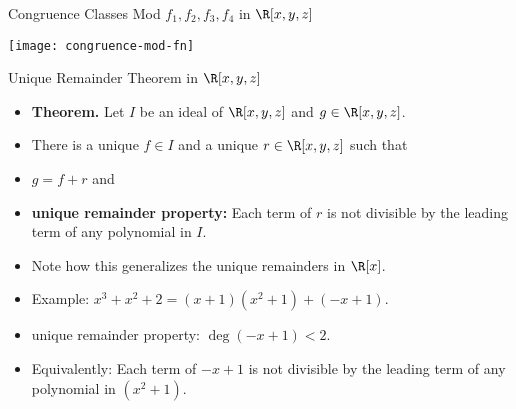 \documentclass{beamer}
\begin{document}
\begin{frame}{Congruence Classes Mod $f_1,f_2,f_3,f_4$ in $\R[x,y,z]$}

\begin{center}
\texttt{[image: congruence-mod-fn]}
\end{center}

\end{frame}

\begin{frame}{Unique Remainder Theorem in $\R[x,y,z]$}

\begin{itemize}
  \item \textbf{Theorem.} Let $I$ be an ideal of $\R[x,y,z]$ and $g\in\R[x,y,z]$.
  \item There is a unique $f\in I$ and a unique $r\in\R[x,y,z]$ such that
  \item $g = f + r$  and
  \item \textbf{unique remainder property:} Each term of $r$ is not divisible by the leading term of any polynomial in $I$.
  \item Note how this generalizes the unique remainders in $\R[x]$.
  \item Example: $x^3 + x^2 + 2 = (x+1)(x^2+1) + ( -x + 1)$.
  \item unique remainder property: $\deg(-x+1) < 2$.
  \item Equivalently: Each term of $-x+1$ is not divisible by the leading term of any polynomial in $(x^2 + 1)$.
\end{itemize}

\end{frame}
\end{document}
